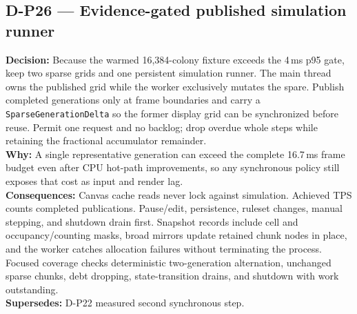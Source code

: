 \subsection*{D-P26 --- Evidence-gated published simulation runner}
\begin{decisionbox}[title={D-P26 \quad 2026-08-09}]
\textbf{Decision:} Because the warmed 16,384-colony fixture exceeds the 4\,ms
p95 gate, keep two sparse grids and one persistent simulation runner. The main
thread owns the published grid while the worker exclusively mutates the spare.
Publish completed generations only at frame boundaries and carry a
\texttt{SparseGenerationDelta} so the former display grid can be synchronized
before reuse. Permit one request and no backlog; drop overdue whole steps while
retaining the fractional accumulator remainder.\\
\textbf{Why:} A single representative generation can exceed the complete
16.7\,ms frame budget even after CPU hot-path improvements, so any synchronous
policy still exposes that cost as input and render lag.\\
\textbf{Consequences:} Canvas cache reads never lock against simulation.
Achieved TPS counts completed publications. Pause/edit, persistence, ruleset
changes, manual stepping, and shutdown drain first. Snapshot records include
cell and occupancy/counting masks, broad mirrors update retained chunk nodes in
place, and the worker catches allocation failures without terminating the
process. Focused coverage checks deterministic two-generation alternation,
unchanged sparse chunks, debt dropping, state-transition drains, and shutdown
with work outstanding.\\
\textbf{Supersedes:} D-P22 measured second synchronous step.
\end{decisionbox}

